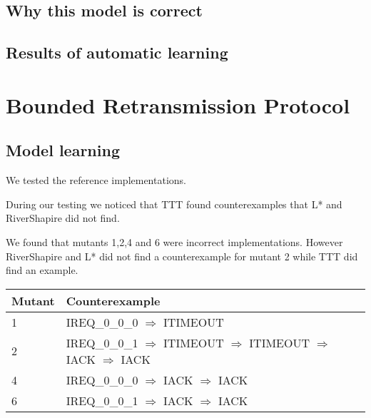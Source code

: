\documentclass[11pt,a4paper]{article}
\begin{document}
\subsection{Why this model is correct}



\subsection{Results of automatic learning}



\section{Bounded Retransmission Protocol}

\subsection{Model learning}
We tested the reference implementations.

During our testing we noticed that TTT found counterexamples that L* and
RiverShapire did not find.

We found that mutants 1,2,4 and 6 were incorrect implementations.
However RiverShapire and L* did not find a counterexample for mutant 2
while TTT did find an example.

\begin{center}
\begin{tabular}{l|l}
\textbf{Mutant} & \textbf{Counterexample}\\
\hline
1 & IREQ\_0\_0\_0 $\Rightarrow$ ITIMEOUT\\
2 & IREQ\_0\_0\_1 $\Rightarrow$ ITIMEOUT $\Rightarrow$ ITIMEOUT $\Rightarrow$ IACK $\Rightarrow$ IACK\\
4 & IREQ\_0\_0\_0 $\Rightarrow$ IACK $\Rightarrow$ IACK\\
6 & IREQ\_0\_0\_1 $\Rightarrow$ IACK $\Rightarrow$ IACK\\
\end{tabular}
\end{center}
\end{document}
